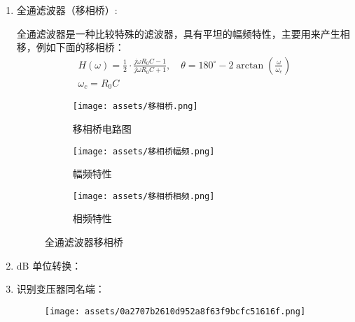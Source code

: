 \documentclass[a4paper]{article}  %
\theoremstyle{MyLineTheoremStyle} %
\theoremstyle{MyBlockTheoremStyle} %
\theoremstyle{MySubsubsectionStyle} %
\begin{document}
\begin{multicols*}{4}
\begin{enumerate}
\item 全通滤波器（移相桥）:

全通滤波器是一种比较特殊的滤波器，具有平坦的幅频特性，主要用来产生相移，例如下面的移相桥：
\begin{gather}
H(\omega) = \frac{1}{2}\cdot\frac{j\omega R_0C - 1}{j\omega R_0C + 1},\quad \theta = 180^{\circ} - 2 \arctan \left(\frac{\omega}{\omega_c} \right)\\
\omega_c = R_0C
\end{gather}
\begin{figure}[H]\centering
\begin{subfigure}[b]{\columnwidth}\centering
    \texttt{[image: assets/移相桥.png]}
    \caption{移相桥电路图}
\end{subfigure}\hfill
\begin{subfigure}[b]{\columnwidth}\centering
    \texttt{[image: assets/移相桥幅频.png]}
    \caption{幅频特性}
\end{subfigure}
\begin{subfigure}[b]{\columnwidth}\centering
    \texttt{[image: assets/移相桥相频.png]}
    \caption{相频特性}
\end{subfigure}
\caption{全通滤波器移相桥}
\end{figure}

\item dB 单位转换：
\begin{table}[H]\centering
    \caption{增益与 dB 值的对应关系}
    \label{增益与 dB 值的对应关系}
\end{table}

\item 识别变压器同名端：
\begin{figure}[H]\centering
    \texttt{[image: assets/0a2707b2610d952a8f63f9bcfc51616f.png]}
\end{figure}

\end{enumerate}
\end{multicols*}  
\end{document}
